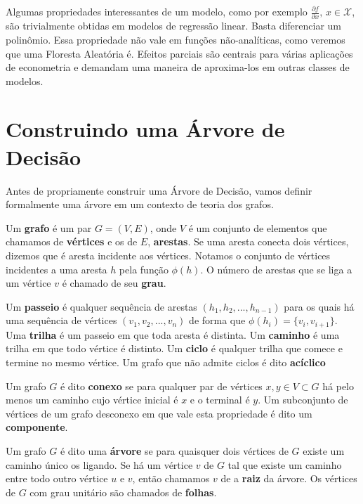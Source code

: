 Algumas propriedades interessantes de um modelo, como por exemplo $\frac{\partial f}{\partial x}, \, x \in \mathcal{X}$, são trivialmente obtidas em modelos de regressão linear. Basta diferenciar um polinômio. Essa propriedade não vale em funções não-analíticas, como veremos que uma Floresta Aleatória é. Efeitos parciais são centrais para várias aplicações de econometria e demandam uma maneira de aproxima-los em outras classes de modelos.

\section{Construindo uma Árvore de Decisão}

Antes de propriamente construir uma Árvore de Decisão, vamos definir formalmente uma árvore em um contexto de teoria dos grafos. 

\begin{defi}
Um \textbf{grafo} é um par $G = (V, E)$, onde $V$ é um conjunto de elementos que chamamos de \textbf{vértices} e os de $E$, \textbf{arestas}. Se uma aresta conecta dois vértices, dizemos que é aresta incidente aos vértices. Notamos o conjunto de vértices incidentes a uma aresta $h$ pela função $\phi(h)$. O número de arestas que se liga a um vértice $v$ é chamado de seu \textbf{grau}.
\end{defi}

\begin{defi}
Um \textbf{passeio} é qualquer sequência de arestas $(h_1, h_2, ..., h_{n-1})$ para os quais há uma sequência de vértices $(v_1, v_2, ..., v_n)$ de forma que $\phi(h_i) = \{v_i, v_{i+1}\}$. Uma \textbf{trilha} é um passeio em que toda aresta é distinta. Um \textbf{caminho} é uma trilha em que todo vértice é distinto. Um \textbf{ciclo} é qualquer trilha que comece e termine no mesmo vértice. Um grafo que não admite ciclos é dito \textbf{acíclico}
\end{defi}

\begin{defi}
Um grafo $G$ é dito \textbf{conexo} se para qualquer par de vértices $x, y \in V \subset G$ há pelo menos um caminho cujo vértice inicial é $x$ e o terminal é $y$. Um subconjunto de vértices de um grafo desconexo em que vale esta propriedade é dito um \textbf{componente}.
\end{defi}


\begin{defi}
Um grafo $G$ é dito uma \textbf{árvore} se para quaisquer dois vértices de $G$ existe um caminho único os ligando. Se há um vértice $v$ de $G$ tal que existe um caminho entre todo outro vértice $u$ e $v$, então chamamos $v$ de a \textbf{raiz} da árvore. Os vértices de $G$ com grau unitário são chamados de \textbf{folhas}.
\end{defi}

